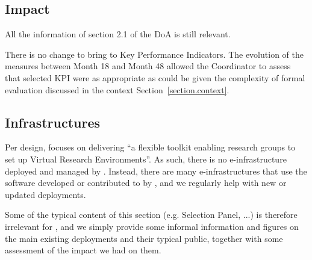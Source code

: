   \subsection{Impact}

  All the information of section 2.1 of the DoA is still relevant.

  There is no change to bring to Key Performance Indicators.
  The evolution of the measures between Month 18 and Month 48 allowed
  the Coordinator to assess that selected KPI were as appropriate as
  could be given the complexity of formal evaluation discussed in the
  context Section~\ref{section.context}.

\subsection{Infrastructures}

\label{infrastructures}

Per design, \ODK focuses on delivering ``a flexible toolkit enabling
research groups to set up Virtual Research Environments''. As such,
there is no e-infrastructure deployed and managed by \ODK. Instead,
there are many e-infrastructures that use the software developed or
contributed to by \ODK, and we regularly help with new or updated
deployments.

Some of the typical content of this section (e.g. Selection Panel,
...) is therefore irrelevant for \ODK, and we simply provide some
informal information and figures on the main existing deployments and
their typical public, together with some assessment of the impact we
had on them.

